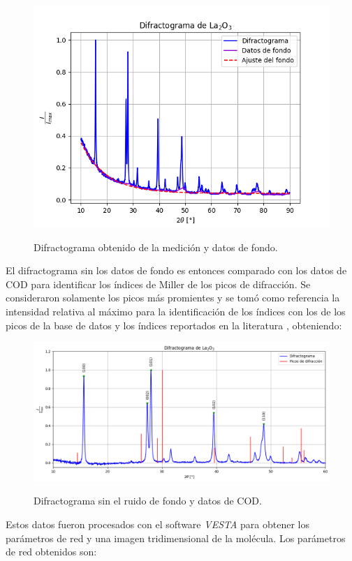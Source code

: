 \documentclass[final,5p,times,twocolumn, nopreprintline]{elsarticle}
\numberwithin{equation}{section}
\begin{document}
\begin{figure}[h!]

\centering
\includegraphics[width=0.8\columnwidth]{../raw_xrd.png} \label{fig:rawxrd}
\caption{Difractograma obtenido de la medición y datos de fondo.}
\end{figure}

El difractograma sin los datos de fondo es entonces comparado con los datos de COD para identificar los índices de Miller de los picos de difracción. Se consideraron solamente los picos más promientes y se tomó como referencia la intensidad relativa al máximo para la identificación de los índices con los de los picos de la base de datos y los índices reportados en la literatura \cite{kabir2018influence}, obteniendo:

\begin{figure}[h!]

\centering
\includegraphics[width=\columnwidth]{../peaks.png} \label{fig:filtxrd}
\caption{Difractograma sin el ruido de fondo y datos de COD.}
\end{figure}

Estos datos fueron procesados con el software \textit{VESTA} para obtener los parámetros de red y una imagen tridimensional de la molécula. Los parámetros de red obtenidos son:
\end{document}

